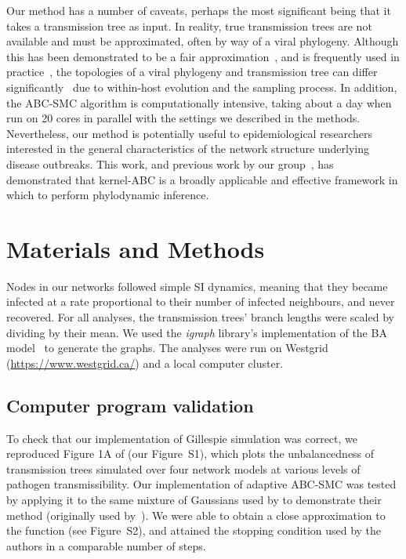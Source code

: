 \documentclass[nogrid]{MBE}
\begin{document}
Our method has a number of caveats, perhaps the most significant being that it
takes a transmission tree as input. In reality, true transmission trees are not
available and must be approximated, often by way of a viral phylogeny. Although
this has been demonstrated to be a fair
approximation~\citep[e.g.][]{leitner1996accurate}, and is frequently used in
practice~\citep[e.g.][]{stadler2013uncovering}, the topologies of a viral
phylogeny and transmission tree can differ
significantly~\citep{ypma2013relating} due to within-host evolution and the
sampling process. In addition, the ABC-SMC algorithm is
computationally intensive, taking about a day when run on 20 cores in parallel
with the settings we described in the methods. Nevertheless, our method is
potentially useful to epidemiological researchers interested in the general
characteristics of the network structure underlying disease outbreaks. This
work, and previous work by our group~\citep{poon2015phylodynamic}, has
demonstrated that kernel-ABC is a broadly applicable and effective framework in
which to perform phylodynamic inference.

\section{Materials and Methods}
  
Nodes in our networks followed simple SI dynamics, meaning that they
became infected at a rate proportional to their number of infected neighbours,
and never recovered. For all analyses, the transmission trees' branch lengths
were scaled by dividing by their mean. We used the \textit{igraph} library's
implementation of the BA model~\citep{csardi2006igraph} to generate the graphs.
The analyses were run on Westgrid (\url{https://www.westgrid.ca/}) and a local
computer cluster.

\subsection{Computer program validation}

To check that our implementation of Gillespie simulation was correct, we
reproduced Figure 1A of \citet{leventhal2012inferring} (our Figure~S1), which
plots the unbalancedness of transmission trees simulated over four network
models at various levels of pathogen transmissibility. Our implementation of
adaptive ABC-SMC was tested by applying it to the same mixture of Gaussians
used by \citeauthor{del2012adaptive} to demonstrate their method (originally
used by~\citet{sisson2007sequential}). We were able to obtain a close
approximation to the function (see Figure~S2), and attained the stopping
condition used by the authors in a comparable number of steps. 
\end{document}
